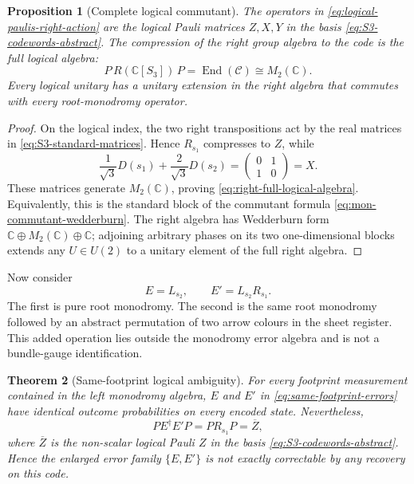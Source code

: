\documentclass[11pt]{article}
\newtheorem{theorem}{Theorem}[section]
\newtheorem{proposition}[theorem]{Proposition}
\theoremstyle{definition}
\theoremstyle{remark}
\newcommand{\C}{\mathbb C}
\newcommand{\cC}{\mathcal C}
\newcommand{\End}{\operatorname{End}}
\begin{document}
\begin{proposition}[Complete logical commutant]\label{prop:S3-logical-commutant}
The operators in \eqref{eq:logical-paulis-right-action} are the logical Pauli matrices $Z,X,Y$ in the basis \eqref{eq:S3-codewords-abstract}.  The compression of the right group algebra to the code is the full logical algebra:
\begin{equation}\label{eq:right-full-logical-algebra}
 P\,R(\C[S_3])\,P=\End(\cC)\cong M_2(\C).
\end{equation}
Every logical unitary has a unitary extension in the right algebra that commutes with every root-monodromy operator.
\end{proposition}

\begin{proof}
On the logical index, the two right transpositions act by the real matrices in \eqref{eq:S3-standard-matrices}.  Hence $R_{s_1}$ compresses to $Z$, while
\[
 \frac1{\sqrt3}D(s_1)+\frac2{\sqrt3}D(s_2)
 =\begin{pmatrix}0&1\\1&0\end{pmatrix}=X.
\]
These matrices generate $M_2(\C)$, proving \eqref{eq:right-full-logical-algebra}.  Equivalently, this is the standard block of the commutant formula \eqref{eq:mon-commutant-wedderburn}.  The right algebra has Wedderburn form $\C\oplus M_2(\C)\oplus\C$; adjoining arbitrary phases on its two one-dimensional blocks extends any $U\in U(2)$ to a unitary element of the full right algebra.
\end{proof}

Now consider
\begin{equation}\label{eq:same-footprint-errors}
 E=L_{s_2},
 \qquad
 E'=L_{s_2}R_{s_1}.
\end{equation}
The first is pure root monodromy.  The second is the same root monodromy followed by an abstract permutation of two arrow colours in the sheet register.  This added operation lies outside the monodromy error algebra and is not a bundle-gauge identification.

\begin{theorem}[Same-footprint logical ambiguity]\label{thm:same-footprint-S3}
For every footprint measurement contained in the left monodromy algebra, $E$ and $E'$ in \eqref{eq:same-footprint-errors} have identical outcome probabilities on every encoded state.  Nevertheless,
\begin{equation}\label{eq:S3-residual-logical}
 P E^\dagger E'P
 =P R_{s_1}P
 =\overline Z,
\end{equation}
where $\overline Z$ is the non-scalar logical Pauli $Z$ in the basis \eqref{eq:S3-codewords-abstract}.  Hence the enlarged error family $\{E,E'\}$ is not exactly correctable by any recovery on this code.
\end{theorem}
\end{document}
